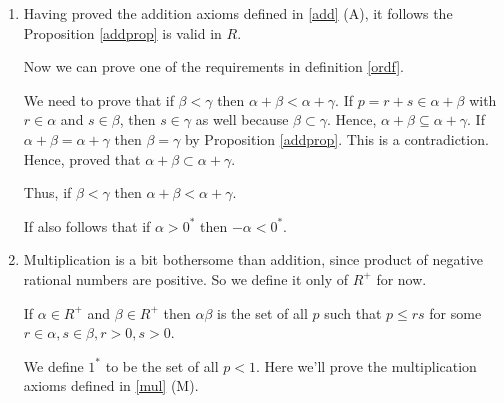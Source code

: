 \begin{enumerate}[{\bf Step 1.}]
\begin{enumerate}[(\text{A}1)]
\end{enumerate}

\item Having proved the addition axioms defined in \ref{add} (A),
it follows the Proposition \ref{addprop} is valid in $R$.

Now we can prove one of the requirements in definition \ref{ordf}.

We need to prove that if $\beta < \gamma$ then $\alpha + \beta < \alpha + \gamma$.
If $p = r + s \in \alpha + \beta$ with $r \in \alpha$ and $s \in \beta$, then $s \in \gamma$ as well because $\beta \subset \gamma$.
Hence, $\alpha + \beta \subseteq \alpha + \gamma$.
If $\alpha + \beta = \alpha + \gamma$ then $\beta = \gamma$ by Proposition \ref{addprop}. 
This is a contradiction. Hence, proved that $\alpha + \beta \subset \alpha + \gamma$.

Thus, if $\beta < \gamma$ then $\alpha + \beta < \alpha + \gamma$.

If also follows that if $\alpha > 0^*$ then $-\alpha < 0^*$.

\item Multiplication is a bit bothersome than addition, since product of negative rational numbers are positive.
So we define it only of $R^+$ for now.

If $\alpha \in R^+$ and $\beta \in R^+$ then $\alpha \beta$ is the set of all $p$ such that $p \leq rs$
for some $r \in \alpha, s \in \beta, r > 0, s > 0$.

We define $1^*$ to be the set of all $p < 1$.
Here we'll prove the multiplication axioms defined in \ref{mul} (M).


\end{enumerate}
